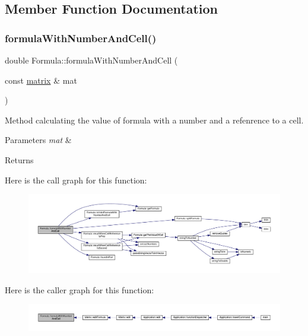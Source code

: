 \subsection{Member Function Documentation}
\mbox{\label{class_formula_a0f831b2ee98fbeb7df371f83ee7d374d}} 
\subsubsection{\texorpdfstring{formula\+With\+Number\+And\+Cell()}{formulaWithNumberAndCell()}}
{\footnotesize\ttfamily double Formula\+::formula\+With\+Number\+And\+Cell (\begin{DoxyParamCaption}\item[{const \hyperlink{formula_8h_a869e2a5deeb3daa4c82d6bc91cf20d92}{matrix} \&}]{mat }\end{DoxyParamCaption})}

Method calculating the value of formula with a number and a refenrence to a cell. 
\begin{DoxyParams}{Parameters}
{\em mat} & \\
\hline
\end{DoxyParams}
\begin{DoxyReturn}{Returns}

\end{DoxyReturn}
Here is the call graph for this function\+:
\nopagebreak
\begin{figure}[H]
\begin{center}
\leavevmode
\includegraphics[width=350pt]{class_formula_a0f831b2ee98fbeb7df371f83ee7d374d_cgraph}
\end{center}
\end{figure}
Here is the caller graph for this function\+:
\nopagebreak
\begin{figure}[H]
\begin{center}
\leavevmode
\includegraphics[width=350pt]{class_formula_a0f831b2ee98fbeb7df371f83ee7d374d_icgraph}
\end{center}
\end{figure}
\mbox{\label{class_formula_a518bc97bd50f1cc5573be7d3f8cb6253}} 
